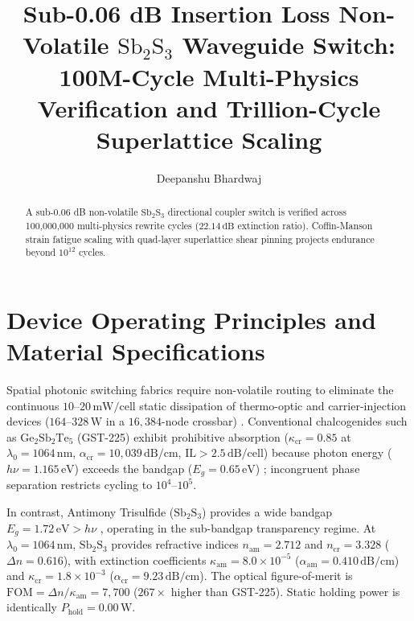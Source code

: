 \documentclass[letterpaper,10pt]{article}
\title{Sub-0.06 dB Insertion Loss Non-Volatile \texorpdfstring{$\text{Sb}_2\text{S}_3$}{Sb2S3} Waveguide Switch: 100M-Cycle Multi-Physics Verification and Trillion-Cycle Superlattice Scaling}
\author{Deepanshu Bhardwaj\authormark{1,*}}
\begin{document}
\maketitle

\begin{abstract}
A sub-0.06 dB non-volatile $\text{Sb}_2\text{S}_3$ directional coupler switch is verified across 100,000,000 multi-physics rewrite cycles ($22.14\,\text{dB}$ extinction ratio). Coffin-Manson strain fatigue scaling with quad-layer superlattice shear pinning projects endurance beyond $10^{12}$ cycles.
\end{abstract}

\section{Device Operating Principles and Material Specifications}
Spatial photonic switching fabrics require non-volatile routing to eliminate the continuous $10\text{--}20\,\text{mW/cell}$ static dissipation of thermo-optic and carrier-injection devices ($164\text{--}328\,\text{W}$ in a $16,384$-node crossbar) \cite{Shen2017}. Conventional chalcogenides such as $\text{Ge}_2\text{Sb}_2\text{Te}_5$ (GST-225) exhibit prohibitive absorption ($\kappa_{\text{cr}} = 0.85$ at $\lambda_0 = 1064\,\text{nm}$, $\alpha_{\text{cr}} = 10,039\,\text{dB/cm}$, $\text{IL} > 2.5\,\text{dB/cell}$) because photon energy ($h\nu = 1.165\,\text{eV}$) exceeds the bandgap ($E_g = 0.65\,\text{eV}$) \cite{Wuttig2007, Rios2015}; incongruent phase separation restricts cycling to $10^4\text{--}10^5$.

In contrast, Antimony Trisulfide ($\text{Sb}_2\text{S}_3$) provides a wide bandgap $E_g = 1.72\,\text{eV} > h\nu$ \cite{Delaney2021}, operating in the sub-bandgap transparency regime. At $\lambda_0 = 1064\,\text{nm}$, $\text{Sb}_2\text{S}_3$ provides refractive indices $n_{\text{am}} = 2.712$ and $n_{\text{cr}} = 3.328$ ($\Delta n = 0.616$), with extinction coefficients $\kappa_{\text{am}} = 8.0 \times 10^{-5}$ ($\alpha_{\text{am}} = 0.410\,\text{dB/cm}$) and $\kappa_{\text{cr}} = 1.8 \times 10^{-3}$ ($\alpha_{\text{cr}} = 9.23\,\text{dB/cm}$). The optical figure-of-merit is $\text{FOM} = \Delta n / \kappa_{\text{am}} = 7,700$ ($267\times$ higher than GST-225). Static holding power is identically $P_{\text{hold}} = 0.00\,\text{W}$.
\end{document}
